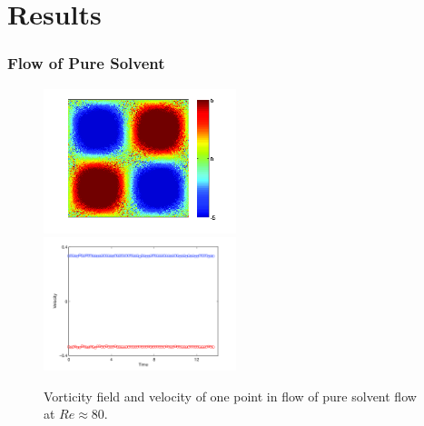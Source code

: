 \section{Results}
\begin{frame}
  \frametitle{Flow of Pure Solvent}

\begin{figure}
    \centering
    \includegraphics[width=0.5\textwidth]{img/polymer_loc-15.png}
    \includegraphics[width=0.5\textwidth]{img/polymer_loc-9.png}
    \caption{Vorticity field and velocity of one point in flow of pure solvent flow at $Re\approx 80$.}
    \label{fig:vor_sol}
  \end{figure}
\end{frame}

